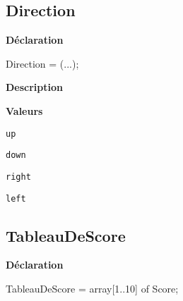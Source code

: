 \documentclass{report}
\newif\ifpdf
\begin{document}
\subsection*{Direction}
\fi
\label{Types-Direction}
\begin{list}{}{
\setlength{\itemindent}{0cm}
\setlength{\listparindent}{0cm}
\setlength{\leftmargin}{\evensidemargin}
\addtolength{\leftmargin}{\tmplength}
\settowidth{\labelsep}{X}
\addtolength{\leftmargin}{\labelsep}
\setlength{\labelwidth}{\tmplength}
}
\item[\textbf{Déclaration}\hfill]
\ifpdf
\begin{flushleft}
\fi
\begin{ttfamily}
Direction = (...);\end{ttfamily}

\ifpdf
\end{flushleft}
\fi

\par
\item[\textbf{Description}]
 \item[\textbf{Valeurs}]
\begin{description}
\item[\texttt{up}] \label{Types-up}
\index{}
 
\item[\texttt{down}] \label{Types-down}
\index{}
 
\item[\texttt{right}] \label{Types-right}
\index{}
 
\item[\texttt{left}] \label{Types-left}
\index{}
 
\end{description}


\end{list}
\ifpdf
\subsection*{\large{\textbf{TableauDeScore}}\normalsize\hspace{1ex}\hrulefill}
\else
\subsection*{TableauDeScore}
\fi
\label{Types-TableauDeScore}
\begin{list}{}{
\setlength{\itemindent}{0cm}
\setlength{\listparindent}{0cm}
\setlength{\leftmargin}{\evensidemargin}
\addtolength{\leftmargin}{\tmplength}
\settowidth{\labelsep}{X}
\addtolength{\leftmargin}{\labelsep}
\setlength{\labelwidth}{\tmplength}
}
\item[\textbf{Déclaration}\hfill]
\ifpdf
\begin{flushleft}
\fi
\begin{ttfamily}
TableauDeScore = array[1..10] of Score;\end{ttfamily}

\ifpdf
\end{flushleft}
\fi

\end{list}
\ifpdf
\end{document}
